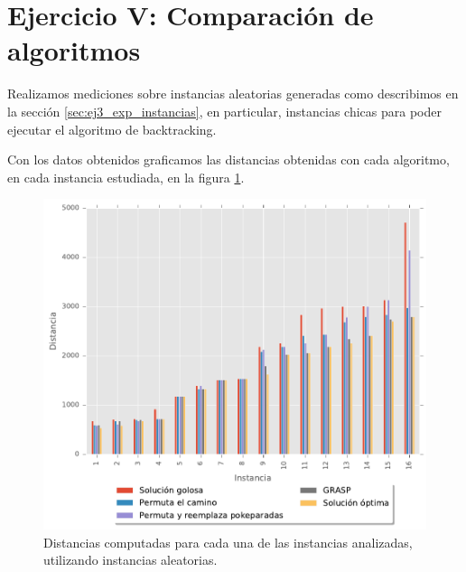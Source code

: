 \section{Ejercicio V: Comparaci\'on de algoritmos}

Realizamos mediciones sobre instancias aleatorias generadas como describimos en la secci\'on \ref{sec:ej3_exp_instancias}, en particular, instancias chicas para poder ejecutar el algoritmo de backtracking.

Con los datos obtenidos graficamos las distancias obtenidas con cada algoritmo, en cada instancia estudiada, en la figura \ref{fig:ej5_expAleatOp_instancia_distancia}.

\begin{figure}[H]
  \begin{center}
    \includegraphics{../experimentacion/ej5/expAleatOp_instancia_distancia.pdf}
    \caption{Distancias computadas para cada una de las instancias analizadas, utilizando instancias aleatorias.}
    \label{fig:ej5_expAleatOp_instancia_distancia}
  \end{center}
\end{figure}

